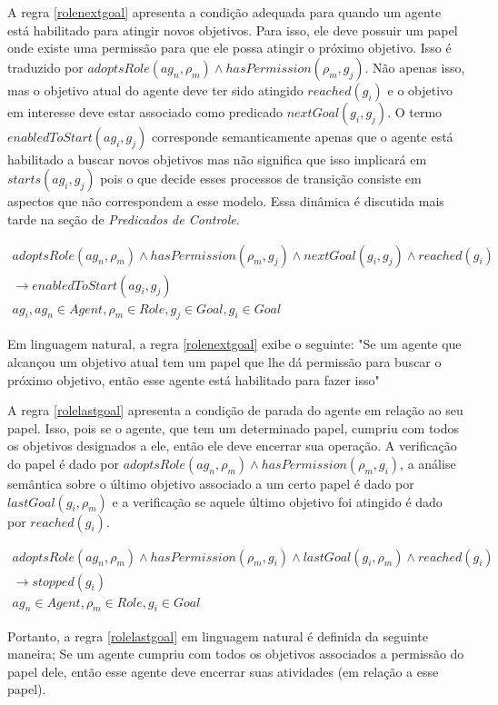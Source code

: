 A regra \ref{rolenextgoal} apresenta a condição adequada para quando um agente está habilitado para atingir novos objetivos. Para isso, ele deve possuir um papel onde existe uma permissão para que ele possa atingir o próximo objetivo. Isso é traduzido por $ adoptsRole(ag_n,\rho_m) \wedge hasPermission(\rho_m,g_j) $. Não apenas isso, mas o objetivo atual do agente deve ter sido atingido $ reached(g_i) $ e o objetivo em interesse deve estar associado como predicado $nextGoal(g_i,g_j)$. O termo $enabledToStart(ag_i,g_j)$ corresponde semanticamente apenas que o agente está habilitado a buscar novos objetivos mas não significa que isso implicará em $starts(ag_i,g_j)$ pois o que decide esses processos de transição consiste em aspectos que não correspondem a esse modelo. Essa dinâmica é discutida mais tarde na seção de \textit{Predicados de Controle}.

\begin{eqnarray}\label{rolenextgoal}
	adoptsRole(ag_n,\rho_m) \wedge hasPermission(\rho_m,g_j) \wedge nextGoal(g_i,g_j) \wedge reached(g_i) \nonumber \\
	\to enabledToStart(ag_i,g_j) \nonumber \\
    ag_i, ag_n \in Agent, \rho_m \in Role, g_j \in Goal, g_i \in Goal
\end{eqnarray}

Em linguagem natural, a regra \ref{rolenextgoal} exibe o seguinte: "Se um agente que alcançou um objetivo atual tem um papel que lhe dá permissão para buscar o próximo objetivo, então esse agente está habilitado para fazer isso"

A regra \ref{rolelastgoal} apresenta a condição de parada do agente em relação ao seu papel. Isso, pois se o agente, que tem um determinado papel, cumpriu com todos os objetivos designados a ele, então ele deve encerrar sua operação. A verificação do papel é dado por $adoptsRole(ag_n,\rho_m) \wedge hasPermission(\rho_m,g_i)$, a análise semântica sobre o último objetivo associado a um certo papel é dado por $lastGoal(g_i,\rho_m)$ e a verificação se aquele último objetivo foi atingido é dado por $reached(g_i)$. 

\begin{eqnarray}\label{rolelastgoal}
	adoptsRole(ag_n,\rho_m) \wedge hasPermission(\rho_m,g_i) \wedge lastGoal(g_i,\rho_m) \wedge reached(g_i) \nonumber \\
	\to stopped(g_i) \nonumber \\
    ag_n \in Agent, \rho_m \in Role, g_i \in Goal
\end{eqnarray}

Portanto, a regra \ref{rolelastgoal} em linguagem natural é definida da seguinte maneira; Se um agente cumpriu com todos os objetivos associados a permissão do papel dele, então esse agente deve encerrar suas atividades (em relação a esse papel). 

